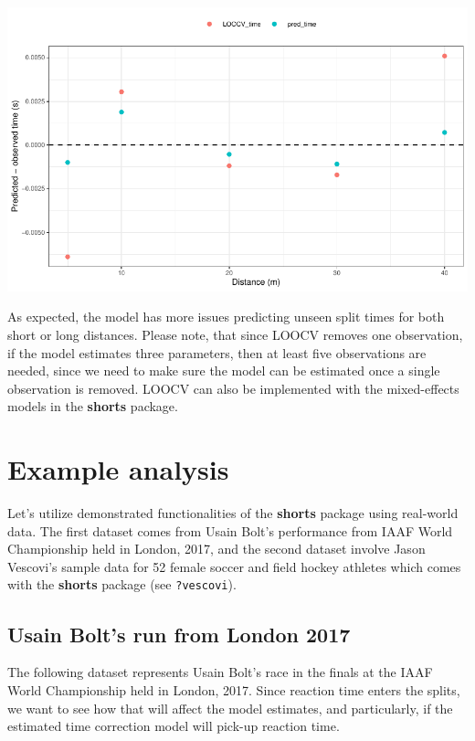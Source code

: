 \documentclass[fleqn,10pt,lineno]{wlpeerj} %
\begin{document}
\begin{center}\includegraphics[width=1\linewidth]{paper_files/figure-latex/unnamed-chunk-58-1} \end{center}

As expected, the model has more issues predicting unseen split times for both short or long distances. Please note, that since LOOCV removes one observation, if the model estimates three parameters, then at least five observations are needed, since we need to make sure the model can be estimated once a single observation is removed. LOOCV can also be implemented with the mixed-effects models in the \textbf{shorts} package.

\hypertarget{example-analysis}{%
\section{Example analysis}\label{example-analysis}}

Let's utilize demonstrated functionalities of the \textbf{shorts} package using real-world data. The first dataset comes from Usain Bolt's performance from IAAF World Championship held in London, 2017, and the second dataset involve Jason Vescovi's sample data for 52 female soccer and field hockey athletes which comes with the \textbf{shorts} package (see \texttt{?vescovi}).

\hypertarget{usain-bolts-run-from-london-2017}{%
\subsection{Usain Bolt's run from London 2017}\label{usain-bolts-run-from-london-2017}}

The following dataset represents Usain Bolt's race in the finals at the IAAF World Championship held in London, 2017. Since reaction time enters the splits, we want to see how that will affect the model estimates, and particularly, if the estimated time correction model will pick-up reaction time.
\end{document}
